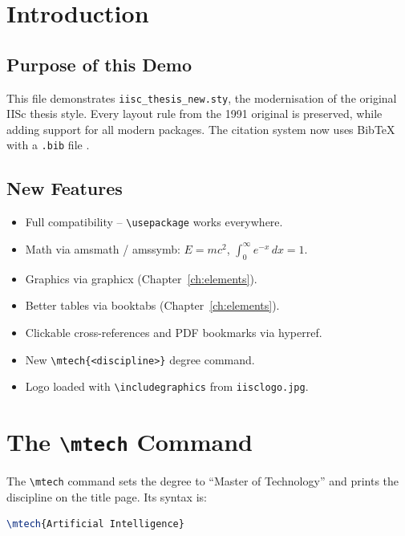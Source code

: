 \documentclass[12pt,a4paper]{report}
\begin{document}
\chapter{Introduction}

\section{Purpose of this Demo}

This file demonstrates \texttt{iisc\_thesis\_new.sty}, the \LaTeXe{}
modernisation of the original IISc thesis style.  Every layout rule from
the 1991 original is preserved, while adding support for all modern packages.
The citation system now uses BibTeX with a \texttt{.bib} file
\cite{MtechAIatIISc2026}.

\section{New Features}

\begin{itemize}
  \item Full \LaTeXe{} compatibility -- \verb|\usepackage| works everywhere.
  \item Math via \textsf{amsmath} / \textsf{amssymb}: $E = mc^2$,
        $\int_0^\infty e^{-x}\,dx = 1$.
  \item Graphics via \textsf{graphicx} (Chapter~\ref{ch:elements}).
  \item Better tables via \textsf{booktabs} (Chapter~\ref{ch:elements}).
  \item Clickable cross-references and PDF bookmarks via \textsf{hyperref}.
  \item New \verb|\mtech{<discipline>}| degree command.
  \item Logo loaded with \verb|\includegraphics| from \texttt{iisclogo.jpg}.
\end{itemize}

\chapter{The \texttt{\textbackslash mtech} Command}

The \verb|\mtech| command sets the degree to ``Master of Technology''
and prints the discipline on the title page.  Its syntax is:

\begin{lstlisting}[language=TeX, caption={Using \textbackslash mtech}]
\mtech{Artificial Intelligence}
\end{lstlisting}
\end{document}

